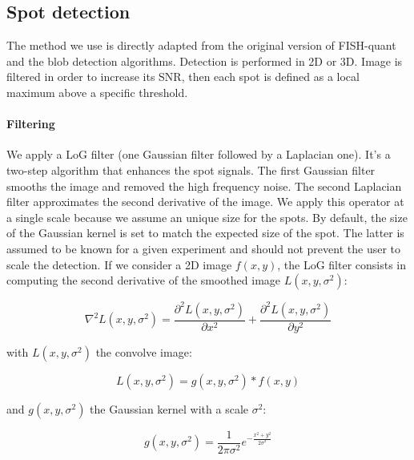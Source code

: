 \subsection{Spot detection} \label{subsec:spot_detection}

The method we use is directly adapted from the original version of FISH-quant\cite{mueller_fish-quant_2013} and the blob detection algorithms\cite{walt_scikit-image_2014}.
Detection is performed in 2D or 3D. Image is filtered in order to increase its \ac{SNR}, then each spot is defined as a local maximum above a specific threshold.

\paragraph{Filtering}

We apply a \ac{LoG} filter (one Gaussian filter followed by a Laplacian one).
It's a two-step algorithm that enhances the spot signals.
The first Gaussian filter smooths the image and removed the high frequency noise.
The second Laplacian filter approximates the second derivative of the image.
We apply this operator at a single scale because we assume an unique size for the spots.
By default, the size of the Gaussian kernel is set to match the expected size of the spot.
The latter is assumed to be known for a given experiment and should not prevent the user to scale the detection.
If we consider a 2D image $f(x,y)$, the \ac{LoG} filter consists in computing the second derivative of the smoothed image $L(x, y, \sigma^2)$:

\begin{equation}
	{\displaystyle \nabla^{2}L(x, y, \sigma^2) = \frac{\partial^{2}L(x, y, \sigma^2)}{\partial x^2} + \frac{\partial^{2}L(x, y, \sigma^2)}{\partial y^2}}
\end{equation}

\noindent
with $L(x, y, \sigma^2)$ the convolve image:

\begin{equation}
	{\displaystyle L(x, y, \sigma^2) = g(x, y, \sigma^2) * f(x, y)}
\end{equation}

\noindent
and $g(x, y, \sigma^2)$ the Gaussian kernel with a scale $\sigma^2$:

\begin{equation}
	{\displaystyle g(x, y, \sigma^2) = \frac{1}{2\pi \sigma^2} e^{-{\frac{x^{2} + y^{2}}{2\sigma^2}}}}
\end{equation}

